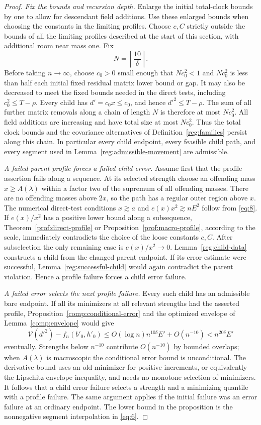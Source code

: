 \begin{proof}
\emph{Fix the bounds and recursion depth.}
Enlarge the initial total-clock bounds by one to allow for descendant
field additions.  Use these enlarged bounds when choosing the
constants in the limiting profiles.
Choose $c,C$ strictly outside the bounds of all the limiting
profiles described at the start of this section, with additional
room near mass one.  Fix
\[
 N=\left\lceil\frac{10}{\delta}\right\rceil.
\]
Before taking $n\to\infty$, choose $c_0>0$ small enough that
$Nc_0^2<1$ and $Nc_0^2$ is less than half each initial fixed residual
matrix lower bound or gap.  It may also be decreased to meet the fixed bounds needed
in the direct tests, including $c_0^2\le T-\rho$.
Every child has $d'=c_0x\le c_0$, and hence $d'^2\le T-\rho$.
The sum of all further matrix removals along a chain of length
$N$ is therefore at most $Nc_0^2$.  All field additions are
increasing and have total size at most $Nc_0^2$.  Thus the total
clock bounds and the covariance alternatives of
Definition~\ref{reg:families} persist along this chain.  In
particular every child endpoint, every feasible child path, and
every segment used in Lemma~\ref{reg:admissible-movement} are
admissible.

\emph{A failed parent profile forces a failed child error.}
Assume first that the profile assertion fails along a sequence.
At its selected strength choose an offending mass $x\ge A(\lambda)$
within a factor two of the supremum of all offending masses.
There are no offending masses above $2x$, so the path has a regular
outer region above $x$.  The numerical direct-test conditions
$x\gtrsim a$ and $e(x)x^2\gtrsim nE^2$ follow from
\eqref{eq:8}.  If
$e(x)/x^2$ has a positive lower bound along a subsequence, Theorem~\ref{prof:direct-profile} or
Proposition~\ref{prof:macro-profile}, according to the scale, immediately
contradicts the choice of the loose constants $c,C$.
After subselection the only remaining case is $e(x)/x^2\to0$.
Lemma~\ref{reg:child-data} constructs a child from the changed
parent endpoint.  If its error estimate were successful,
Lemma~\ref{reg:successful-child} would again contradict the parent
violation.  Hence a profile failure forces a child error failure.

\emph{A failed error selects the next profile failure.}
Every such child has an admissible bare endpoint.  If all its
minimizers at all relevant strengths had the asserted profile,
Proposition~\ref{comp:conditional-error} and the optimized envelope
of Lemma~\ref{comp:envelope} would give
\[
 \mathcal V(d'^2)-f_n(b'_0,h'_0)
       \le O(\log n)n^{10\delta}E'+O(n^{-10})
       <n^{20\delta}E'
\]
eventually.  Strengths below $n^{-10}$ contribute $O(n^{-10})$
by bounded overlaps; when $A(\lambda)$ is macroscopic the
conditional error bound is unconditional.  The derivative bound
uses an old minimizer for positive increments, or equivalently
the Lipschitz envelope inequality, and needs no monotone selection
of minimizers.  It follows that a child error failure selects
a strength and a minimizing quantile with a profile failure.
The same argument applies if the initial failure was an error
failure at an ordinary endpoint.  The lower bound in the
proposition is the nonnegative segment interpolation in
\eqref{eq:6}.


\end{proof}
